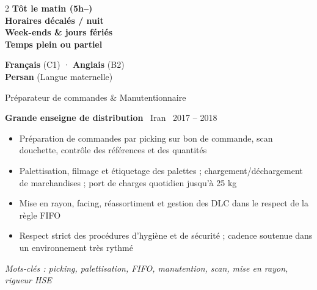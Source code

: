 \documentclass[7pt,a4paper,withhyper]{altacv}
\renewcommand{\cvevent}[4]{%
  {\large\color{emphasis}\raggedright #1\par}
  \smallskip\normalsize
  \ifstrequal{#2}{}{}{%
    \textbf{\color{accent}#2}%
  }%
  \ifstrequal{#4}{}{}{%
    \ifstrequal{#2}{}{}{\hspace{1.5em}}%
    {\small\cvLocationMarker~#4}%
  }%
  \ifstrequal{#3}{}{}{%
    \hfill{\small\cvDateMarker~#3}%
  }\par
}
\begin{document}
\begin{paracol}{2}
\vspace{0.1em}
\vspace{0.2em}
\textbf{Tôt le matin (5h–)}\\\vspace{0.1em}
\textbf{Horaires décalés / nuit}\\\vspace{0.1em}
\textbf{Week-ends \& jours fériés}\\\vspace{0.1em}
\textbf{Temps plein ou partiel}\par

\vspace{0.1em}
\textbf{Français} (C1) · \textbf{Anglais} (B2)\\\vspace{0.1em}
\textbf{Persan} (Langue maternelle)\par

\switchcolumn
\vspace{-0.5em}


\cvevent{Préparateur de commandes \& Manutentionnaire}{Grande enseigne de distribution}{2017 – 2018}{Iran}
\smallskip
\begin{itemize}[leftmargin=1.25em, itemsep=0pt, parsep=0pt]
\item \justifying Préparation de commandes par picking sur bon de commande, scan douchette, contrôle des références et des quantités
\item \justifying Palettisation, filmage et étiquetage des palettes ; chargement/déchargement de marchandises ; port de charges quotidien jusqu'à 25 kg
\item \justifying Mise en rayon, facing, réassortiment et gestion des DLC dans le respect de la règle FIFO
\item \justifying Respect strict des procédures d'hygiène et de sécurité ; cadence soutenue dans un environnement très rythmé
\end{itemize}
\smallskip\noindent\textit{Mots-clés : picking, palettisation, FIFO, manutention, scan, mise en rayon, rigueur HSE}\par

\vspace{0.2em}\par\vspace{0.2em}


\end{paracol}
\end{document}
